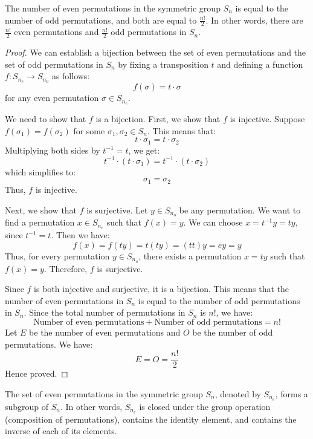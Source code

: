 \documentclass[openany]{book}
\begin{document}
\begin{mytheorem}
    The number of even permutations in the symmetric group \( S_n \) is equal to the number of odd permutations, and both are equal to \( \frac{n!}{2} \). In other words, there are \( \frac{n!}{2} \) even permutations and \( \frac{n!}{2} \) odd permutations in \( S_n \).
\end{mytheorem}
\begin{proof}
    We can establish a bijection between the set of even permutations and the set of odd permutations in \( S_n \) by fixing a transposition \( t \) and defining a function \( f: S_{n_e} \to S_{n_0} \) as follows:
    \[
    f(\sigma) = t \cdot \sigma
    \]
    for any even permutation \( \sigma \in S_{n_e} \). 

    We need to show that \( f \) is a bijection. First, we show that \( f \) is injective. Suppose \( f(\sigma_1) = f(\sigma_2) \) for some \( \sigma_1, \sigma_2 \in S_n \). This means that:
    \[
    t \cdot \sigma_1 = t \cdot \sigma_2
    \]
    Multiplying both sides by \( t^{-1} = t \), we get:
    \[
    t^{-1} \cdot (t \cdot \sigma_1) = t^{-1} \cdot (t \cdot \sigma_2)
    \]
    which simplifies to:
    \[
    \sigma_1 = \sigma_2
    \]
    Thus, \( f \) is injective.

    Next, we show that \( f \) is surjective. Let \( y \in S_{n_o} \) be any permutation. We want to find a permutation \( x \in S_{n_e} \) such that \( f(x) = y \). We can choose \( x = t^{-1} y = t y\), since \( t^{-1} = t\). Then we have:
    \[
    f(x) = f(t y) = t (t y) = (t t) y = e y = y
    \]
    Thus, for every permutation \( y \in S_{n_o}\), there exists a permutation \( x = t y\) such that \( f(x) = y\). Therefore, \( f\) is surjective.

    Since \( f\) is both injective and surjective, it is a bijection. This means that the number of even permutations in \( S_n\) is equal to the number of odd permutations in \( S_n\). Since the total number of permutations in \( S_n\) is \( n!\), we have:
    \[\text{Number of even permutations} + \text{Number of odd permutations} = n!\]
    Let \( E \) be the number of even permutations and \( O \) be the number of odd permutations. We have:
    \[E = O = \frac{n!}{2}\]
    Hence proved. 
\end{proof}
\begin{mytheorem}[$S_{n_e}$ is a subgroup of $S_n$]
    The set of even permutations in the symmetric group \( S_n \), denoted by \( S_{n_e} \), forms a subgroup of \( S_n \). In other words, \( S_{n_e} \) is closed under the group operation (composition of permutations), contains the identity element, and contains the inverse of each of its elements.
\end{mytheorem}
\end{document}
